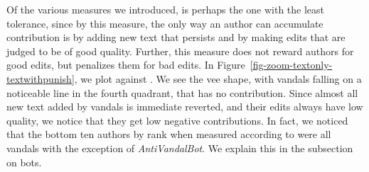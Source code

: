Of the various measures we introduced, \punish is perhaps the
one with the least tolerance, since by this measure, the only way
an author can accumulate contribution is by adding new
text that persists and by making edits that are judged to be
of good quality.
Further, this measure does not reward authors for good edits,
but penalizes them for bad edits.
In Figure~\ref{fig-zoom-textonly-textwithpunish}, we plot \textonly
against \punish.
We see the vee shape, with vandals falling on a noticeable line in
the fourth quadrant, that has no \textonly contribution.
Since almost all new text added by vandals is immediate reverted,
and their edits always have low quality, we notice that they get
low negative \punish contributions.
In fact, we noticed that the bottom ten authors by rank when
measured according to \punish were all vandals with the exception
of \textit{AntiVandalBot}.
We explain this in the subsection on bots.

